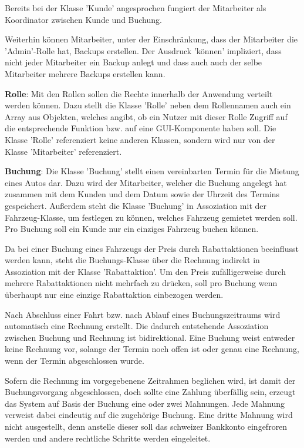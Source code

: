 Bereits bei der Klasse 'Kunde' angesprochen fungiert der Mitarbeiter als Koordinator zwischen Kunde und Buchung. 

Weiterhin können Mitarbeiter, unter der Einschränkung, dass der Mitarbeiter die 'Admin'-Rolle hat, Backups erstellen. Der Ausdruck 'können' impliziert, dass nicht jeder Mitarbeiter ein Backup anlegt und dass auch auch der selbe Mitarbeiter mehrere Backups erstellen kann. 

\textbf{Rolle}: Mit den Rollen sollen die Rechte innerhalb der Anwendung verteilt werden können. Dazu stellt die Klasse 'Rolle' neben dem Rollennamen auch ein Array aus Objekten, welches angibt, ob ein Nutzer mit dieser Rolle Zugriff auf die entsprechende Funktion bzw. auf eine GUI-Komponente haben soll. Die Klasse 'Rolle' referenziert keine anderen Klassen, sondern wird nur von der Klasse 'Mitarbeiter' referenziert.

\textbf{Buchung}: Die Klasse 'Buchung' stellt einen vereinbarten Termin für die Mietung eines Autos dar. Dazu wird der Mitarbeiter, welcher die Buchung angelegt hat zusammen mit dem Kunden und dem Datum sowie der Uhrzeit des Termins gespeichert. Außerdem steht die Klasse 'Buchung' in Assoziation mit der Fahrzeug-Klasse, um festlegen zu können, welches Fahrzeug gemietet werden soll. Pro Buchung soll ein Kunde nur ein einziges Fahrzeug buchen können.

Da bei einer Buchung eines Fahrzeugs der Preis durch Rabattaktionen beeinflusst werden kann, steht die Buchungs-Klasse über die Rechnung indirekt in Assoziation mit der Klasse 'Rabattaktion'. Um den Preis zufälligerweise durch mehrere Rabattaktionen nicht mehrfach zu drücken, soll pro Buchung wenn überhaupt nur eine einzige Rabattaktion einbezogen werden.

Nach Abschluss einer Fahrt bzw. nach Ablauf eines Buchungszeitraums wird automatisch eine Rechnung erstellt. Die dadurch entstehende Assoziation zwischen Buchung und Rechnung ist bidirektional. Eine Buchung weist entweder keine Rechnung vor, solange der Termin noch offen ist oder genau eine Rechnung, wenn der Termin abgeschlossen wurde.

Sofern die Rechnung im vorgegebenene Zeitrahmen beglichen wird, ist damit der Buchungsvorgang abgeschlossen, doch sollte eine Zahlung überfällig sein, erzeugt das System auf Basis der Buchung eine oder zwei Mahnungen. Jede Mahnung verweist dabei eindeutig auf die zugehörige Buchung. Eine dritte Mahnung wird nicht ausgestellt, denn anstelle dieser soll das schweizer Bankkonto eingefroren werden und andere rechtliche Schritte werden eingeleitet. 


